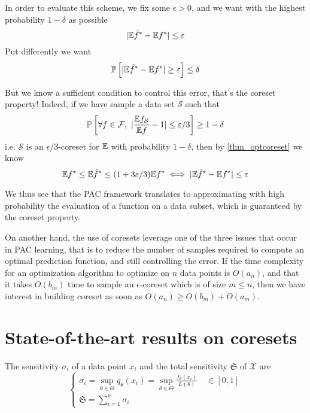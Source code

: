 In order to evaluate this scheme, we fix some $\epsilon>0$, and we want with the highest probability $1-\delta$ as possible
\begin{equation*}
    |\mathbb{E} \hat f^* - \mathbb{E} f^*| \le \varepsilon
\end{equation*} 
Put differently we want
\begin{equation*}
	\mathbb{P}\left[|\mathbb{E} \hat f^* - \mathbb{E} f^*| \ge \varepsilon\right] \leq \delta
\end{equation*}

But we know a sufficient condition to control this error, that's the coreset property! Indeed, if we have sample a data set $\mathcal{S}$ such that
\begin{equation*}
    \mathbb{P}_{}\left[\forall f \in \mathcal{F},\ |\frac{\mathbb{E} f_{\mathcal{S}}}{\mathbb{E} f} - 1| \leq \varepsilon/3\right] \geq 1- \delta
\end{equation*}
i.e. $\mathcal{S}$ is an $\epsilon/3$-coreset for $\mathbb{E}$ with probability $1-\delta$, then by \ref{thm_optcoreset} we know 
\begin{equation*}
    \mathbb{E} f^* \leq \mathbb{E} \hat f^* \leq (1+ 3 \varepsilon/3) \mathbb{E} f^* \iff
    |\mathbb{E} \hat f^* - \mathbb{E} f^*| \leq \varepsilon
\end{equation*}

We thus see that the PAC framework translates to approximating with high probability the evaluation of a function on a data subset, which is guaranteed by the coreset property. 

On another hand, the use of coresets leverage one of the three issues that occur in PAC learning, that is to reduce the number of samples required to compute an optimal prediction function, and still controlling the error. If the time complexity for an optimization algorithm to optimize on $n$ data points is $O(a_n)$, and that it takes $O(b_m)$ time to sample an $\epsilon$-coreset which is of size $m \le n$, then we have interest in building coreset as soon as $O(a_n) \geq O(b_m) + O(a_m)$.







\section{State-of-the-art results on coresets}
\begin{definition}[Sensitivity]
	The sensitivity $\sigma_i$ of a data point $x_{i}$ and the total sensitivity $\mathfrak S$ of $\mathcal X$ are
	$$
	\begin{cases}
		\sigma_{i}=\sup_{\theta \in \Theta} q_{\theta}(x_i) = \sup _{\theta \in \Theta} \frac{f_{\theta}\left(x_{i}\right)}{L(\theta)} \quad \in[0,1]\\
		\mathfrak{S}=\sum_{i=1}^{n} \sigma_{i}
	\end{cases}
	$$
\end{definition} 

